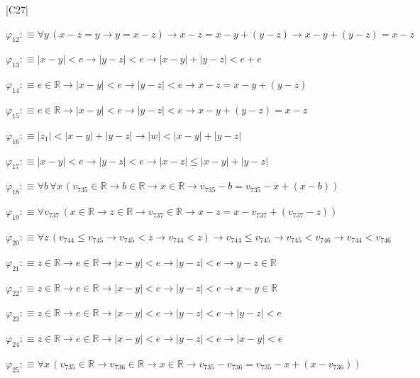 \begin{fullproof}{[C27]}
\begin{abbrevlist}
\item $\varphi_{12} :\equiv \forall y\,(x - z = y \to y = x - z) \to x - z = x - y + (y - z) \to x - y + (y - z) = x - z$
\item $\varphi_{13} :\equiv \lvert x - y \rvert < e \to \lvert y - z \rvert < e \to \lvert x - y \rvert + \lvert y - z \rvert < e + e$
\item $\varphi_{14} :\equiv e \in \mathbb{R} \to \lvert x - y \rvert < e \to \lvert y - z \rvert < e \to x - z = x - y + (y - z)$
\item $\varphi_{15} :\equiv e \in \mathbb{R} \to \lvert x - y \rvert < e \to \lvert y - z \rvert < e \to x - y + (y - z) = x - z$
\item $\varphi_{16} :\equiv \lvert z_{1} \rvert < \lvert x - y \rvert + \lvert y - z \rvert \to \lvert w \rvert < \lvert x - y \rvert + \lvert y - z \rvert$
\item $\varphi_{17} :\equiv \lvert x - y \rvert < e \to \lvert y - z \rvert < e \to \lvert x - z \rvert \leq \lvert x - y \rvert + \lvert y - z \rvert$
\item $\varphi_{18} :\equiv \forall b\,\forall x\,(v_{735} \in \mathbb{R} \to b \in \mathbb{R} \to x \in \mathbb{R} \to v_{735} - b = v_{735} - x + (x - b))$
\item $\varphi_{19} :\equiv \forall v_{737}\,(x \in \mathbb{R} \to z \in \mathbb{R} \to v_{737} \in \mathbb{R} \to x - z = x - v_{737} + (v_{737} - z))$
\item $\varphi_{20} :\equiv \forall z\,(v_{744} \leq v_{745} \to v_{745} < z \to v_{744} < z) \to v_{744} \leq v_{745} \to v_{745} < v_{746} \to v_{744} < v_{746}$
\item $\varphi_{21} :\equiv z \in \mathbb{R} \to e \in \mathbb{R} \to \lvert x - y \rvert < e \to \lvert y - z \rvert < e \to y - z \in \mathbb{R}$
\item $\varphi_{22} :\equiv z \in \mathbb{R} \to e \in \mathbb{R} \to \lvert x - y \rvert < e \to \lvert y - z \rvert < e \to x - y \in \mathbb{R}$
\item $\varphi_{23} :\equiv z \in \mathbb{R} \to e \in \mathbb{R} \to \lvert x - y \rvert < e \to \lvert y - z \rvert < e \to \lvert y - z \rvert < e$
\item $\varphi_{24} :\equiv z \in \mathbb{R} \to e \in \mathbb{R} \to \lvert x - y \rvert < e \to \lvert y - z \rvert < e \to \lvert x - y \rvert < e$
\item $\varphi_{25} :\equiv \forall x\,(v_{735} \in \mathbb{R} \to v_{736} \in \mathbb{R} \to x \in \mathbb{R} \to v_{735} - v_{736} = v_{735} - x + (x - v_{736}))$

\end{abbrevlist}
\end{fullproof}
